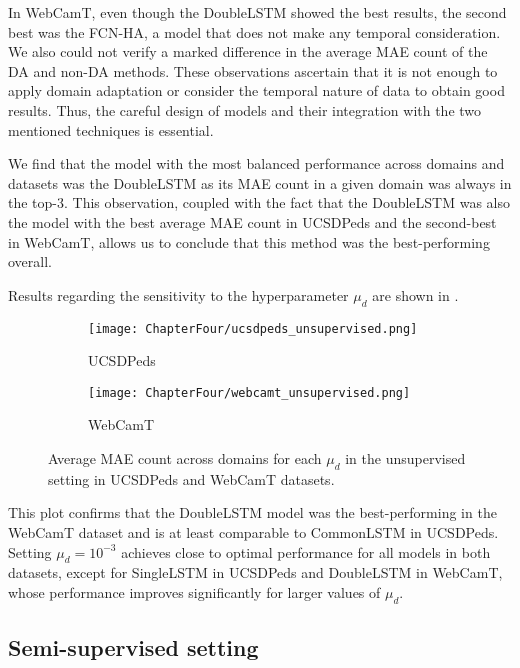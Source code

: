 In WebCamT, even though the DoubleLSTM showed the best results, the second best was the FCN-HA, a model that does not make any temporal consideration. We also could not verify a marked difference in the average MAE count of the DA and non-DA methods. These observations ascertain that it is not enough to apply domain adaptation or consider the temporal nature of data to obtain good results. Thus, the careful design of models and their integration with the two mentioned techniques is essential.

We find that the model with the most balanced performance across domains and datasets was the DoubleLSTM as its MAE count in a given domain was always in the top-3. This observation, coupled with the fact that the DoubleLSTM was also the model with the best average MAE count in UCSDPeds and the second-best in WebCamT, allows us to conclude that this method was the best-performing overall.

Results regarding the sensitivity to the hyperparameter $\mu_d$ are shown in .

\begin{figure}[!ht]
    \begin{subfigure}{.5\textwidth}
        \centering
        \texttt{[image: ChapterFour/ucsdpeds\_unsupervised.png]}
        \caption{UCSDPeds}
    \end{subfigure}
    \begin{subfigure}{.5\textwidth}
        \centering
        \texttt{[image: ChapterFour/webcamt\_unsupervised.png]}
        \caption{WebCamT}
    \end{subfigure}
    \caption{Average MAE count across domains for each $\mu_d$ in the unsupervised setting in UCSDPeds and WebCamT datasets.}
    \label{fig:lambda_d_unsup}
\end{figure}

This plot confirms that the DoubleLSTM model was the best-performing in the WebCamT dataset and is at least comparable to CommonLSTM in UCSDPeds. Setting $\mu_d = 10^{-3}$ achieves close to optimal performance for all models in both datasets, except for SingleLSTM in UCSDPeds and DoubleLSTM in WebCamT, whose performance improves significantly for larger values of $\mu_d$.

\subsection{Semi-supervised setting}

